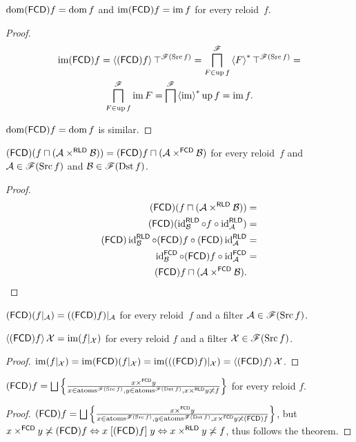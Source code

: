 \begin{prop}
$\operatorname{dom}(\mathsf{FCD}) f=\operatorname{dom} f$ and $\operatorname{im}(\mathsf{FCD}) f=\operatorname{im} f$ for every reloid~$f$.\end{prop}
\begin{proof}
~
\begin{multline*}
\operatorname{im}(\mathsf{FCD}) f=\left\langle (\mathsf{FCD}) f\right\rangle\top^{\mathscr{F}(\operatorname{Src} f)}=\bigsqcap_{F\in\operatorname{up} f}^{\mathscr{F}}\left\langle F\right\rangle ^{\ast}\top^{\mathscr{F}(\operatorname{Src} f)}=\\
\bigsqcap_{F\in\operatorname{up} f}^{\mathscr{F}}\operatorname{im} F=\bigsqcap^{\mathscr{F}}\left\langle \operatorname{im}\right\rangle ^{\ast}\operatorname{up} f=\operatorname{im} f.
\end{multline*}


$\operatorname{dom}(\mathsf{FCD}) f=\operatorname{dom} f$ is similar.\end{proof}
\begin{prop}
$(\mathsf{FCD})(f\sqcap(\mathcal{A}\times^{\mathsf{RLD}}\mathcal{B}))=(\mathsf{FCD}) f\sqcap(\mathcal{A}\times^{\mathsf{FCD}}\mathcal{B})$
for every reloid~$f$ and $\mathcal{A}\in\mathscr{F}(\operatorname{Src} f)$ and
$\mathcal{B}\in\mathscr{F}(\operatorname{Dst} f)$.\end{prop}
\begin{proof}
~
\begin{align*}
(\mathsf{FCD})(f\sqcap(\mathcal{A}\times^{\mathsf{RLD}}\mathcal{B})) & =\\
(\mathsf{FCD})(\operatorname{id}_{\mathcal{B}}^{\mathsf{RLD}}\circ f\circ\operatorname{id}_{\mathcal{A}}^{\mathsf{RLD}}) & =\\
(\mathsf{FCD})\operatorname{id}_{\mathcal{B}}^{\mathsf{RLD}}\circ(\mathsf{FCD}) f\circ(\mathsf{FCD})\operatorname{id}_{\mathcal{A}}^{\mathsf{RLD}} & =\\
\operatorname{id}_{\mathcal{B}}^{\mathsf{FCD}}\circ(\mathsf{FCD}) f\circ\operatorname{id}_{\mathcal{A}}^{\mathsf{FCD}} & =\\
(\mathsf{FCD}) f\sqcap(\mathcal{A}\times^{\mathsf{FCD}}\mathcal{B}).
\end{align*}
\end{proof}
\begin{cor}
$(\mathsf{FCD})(f|_{\mathcal{A}})=((\mathsf{FCD}) f)|_{\mathcal{A}}$ for every reloid~$f$
and a filter $\mathcal{A}\in\mathscr{F}(\operatorname{Src} f)$.\end{cor}
\begin{prop}
$\left\langle (\mathsf{FCD}) f\right\rangle\mathcal{X}=\operatorname{im}(f|_{\mathcal{X}})$ for every reloid
$f$ and a filter $\mathcal{X}\in\mathscr{F}(\operatorname{Src} f)$.\end{prop}
\begin{proof}
$\operatorname{im}(f|_{\mathcal{X}})=\operatorname{im}(\mathsf{FCD})(f|_{\mathcal{X}})=\operatorname{im}(((\mathsf{FCD}) f)|_{\mathcal{X}})=\left\langle (\mathsf{FCD}) f\right\rangle\mathcal{X}$.\end{proof}
\begin{prop}
$(\mathsf{FCD}) f=\bigsqcup\left\{ \frac{x\times^{\mathsf{FCD}}y}{x\in\operatorname{atoms}^{\mathscr{F}(\operatorname{Src} f)},y\in\operatorname{atoms}^{\mathscr{F}(\operatorname{Dst} f)},x\times^{\mathsf{RLD}}y\not\asymp f}\right\}$
for every reloid $f$.\end{prop}
\begin{proof}
$(\mathsf{FCD}) f=\bigsqcup\left\{ \frac{x\times^{\mathsf{FCD}}y}{x\in\operatorname{atoms}^{\mathscr{F}(\operatorname{Src} f)},y\in\operatorname{atoms}^{\mathscr{F}(\operatorname{Dst} f)},x\times^{\mathsf{FCD}}y\not\asymp(\mathsf{FCD}) f}\right\}$,
but $x\times^{\mathsf{FCD}}y\not\asymp(\mathsf{FCD}) f\Leftrightarrow x\mathrel{\left[(\mathsf{FCD}) f\right]}y\Leftrightarrow x\times^{\mathsf{RLD}}y\not\asymp f$,
thus follows the theorem.
\end{proof}

